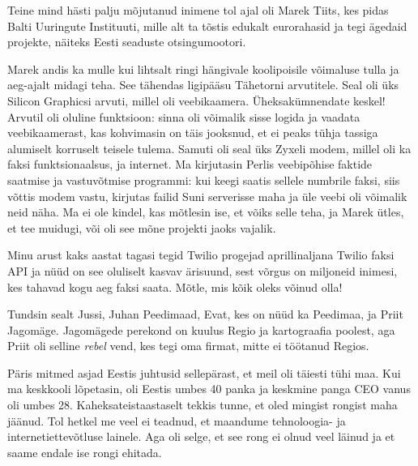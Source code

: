 Teine mind hästi palju mõjutanud inimene tol ajal oli Marek 
Tiits, kes pidas Balti Uuringute 
Instituuti, mille alt ta tõstis edukalt 
eurorahasid ja tegi ägedaid projekte, näiteks Eesti seaduste 
otsingumootori.

Marek andis ka mulle kui lihtsalt ringi hängivale 
koolipoisile võimaluse tulla ja aeg-ajalt midagi teha. See tähendas 
ligipääsu Tähetorni arvutitele. Seal oli üks Silicon Graphicsi 
arvuti, millel oli veebikaamera. Üheksakümnendate keskel! Arvutil oli oluline 
funktsioon: sinna oli võimalik sisse logida ja vaadata veebikaamerast, kas 
kohvimasin on täis jooksnud, et ei peaks tühja tassiga alumiselt korruselt 
teisele tulema. Samuti oli seal üks Zyxeli modem, 
millel oli ka faksi funktsionaalsus, ja internet. Ma 
kirjutasin Perlis veebipõhise faktide saatmise ja vastuvõtmise programmi: kui keegi saatis sellele numbrile faksi, siis võttis 
modem vastu, kirjutas failid Suni serverisse maha ja üle veebi oli 
võimalik neid näha. Ma ei ole kindel, kas mõtlesin ise, et võiks selle teha, ja Marek ütles, et tee muidugi, või oli see 
mõne projekti jaoks vajalik.


Minu arust kaks aastat tagasi 
tegid Twilio progejad aprillinaljana Twilio faksi API ja 
nüüd on see oluliselt kasvav ärisuund, sest võrgus on 
miljoneid inimesi, kes tahavad kogu aeg faksi saata. Mõtle, mis kõik oleks 
võinud olla! 


Tundsin sealt Jussi, Juhan Peedimaad, Evat, 
kes on nüüd ka Peedimaa, ja Priit 
Jagomäge. Jagomägede perekond on kuulus Regio ja 
kartograafia poolest, aga Priit oli selline \emph{rebel} vend, kes tegi oma firmat,
mitte ei töötanud Regios. 

Päris mitmed asjad Eestis juhtusid sellepärast, et 
meil oli täiesti tühi maa. Kui ma keskkooli 
lõpetasin, oli Eestis umbes 40 panka ja keskmine panga CEO vanus oli umbes 28. 
Kaheksateistaastaselt tekkis tunne, et oled mingist rongist maha jäänud. Tol hetkel me veel ei teadnud, et 
maandume tehnoloogia- ja internetiettevõtluse lainele. Aga oli selge, 
et see rong ei olnud veel läinud ja et saame endale ise rongi ehitada. 

